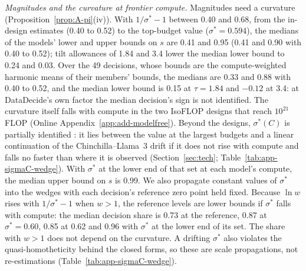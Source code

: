 \textit{Magnitudes and the curvature at frontier compute.} Magnitudes need a curvature (Proposition~\ref{prop:A-pi}(iv)).
With $1/\sigma^*-1$ between 0.40 and 0.68, from the in-design estimates (0.40 to 0.52) to the top-budget value
($\sigma^*=0.594$), the medians of the models' lower and upper bounds on $s$ are 0.41 and 0.95 (0.41 and 0.90 with 0.40
to 0.52); tilt allowances of 1.84 and 3.4 lower the median lower bound to 0.24 and 0.03. Over the 49 decisions, whose
bounds are the compute-weighted harmonic means of their members' bounds, the medians are 0.33 and 0.88 with 0.40 to
0.52, and the median lower bound is 0.15 at $\tau=1.84$ and $-0.12$ at 3.4: at DataDecide's own factor the median
decision's sign is not identified. The curvature itself falls with compute in the two IsoFLOP designs that reach
$10^{21}$ FLOP (Online Appendix~\ref{app:add-modelfree}). Beyond the designs, $\sigma^*(C)$ is partially identified
\citep{manski2003partial}: it lies between the value at the largest budgets and a linear continuation of the
Chinchilla--Llama~3 drift if it does not rise with compute and falls no faster than where it is observed
(Section~\ref{sec:tech}; Table~\ref{tab:app-sigmaC-wedge}). With $\sigma^*$ at the lower end of that set at each model's
compute, the median upper bound on $s$ is 0.99. We also propagate constant values of $\sigma^*$ into the wedges with each
decision's reference zero point held fixed. Because $\ln w$ rises with $1/\sigma^*-1$ when $w>1$, the reference levels
are lower bounds if $\sigma^*$ falls with compute: the median decision share is 0.73 at the reference, 0.87 at
$\sigma^*=0.60$, 0.85 at 0.62 and 0.96 with $\sigma^*$ at the lower end of its set. The share with $w>1$ does not depend
on the curvature. A drifting $\sigma^*$ also violates the quasi-homotheticity behind the closed forms, so these are scale
propagations, not re-estimations (Table~\ref{tab:app-sigmaC-wedge}).

